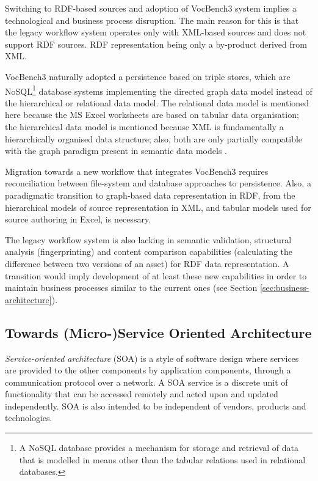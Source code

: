 	Switching to RDF-based sources and adoption of VocBench3 system implies a technological and business process disruption. The main reason for this is that the legacy workflow system operates only with XML-based sources and does not support RDF sources. RDF representation being only a by-product derived from XML. 
	
	VocBench3 naturally adopted a persistence based on triple stores, which are NoSQL\footnote{A NoSQL database provides a mechanism for storage and retrieval of data that is modelled in means other than the tabular relations used in relational databases.} database systems implementing the directed graph data model instead of the hierarchical or relational data model. The relational data model is mentioned here because the MS Excel worksheets are based on tabular data organisation; the hierarchical data model is mentioned because XML is fundamentally a hierarchically organised data structure; also, both are only partially compatible with the graph paradigm present in semantic data models \citep{rdf-semantics}. 
	
	Migration towards a new workflow that integrates VocBench3 requires reconciliation between file-system and database approaches to persistence. Also, a paradigmatic transition to graph-based data representation in RDF, from the hierarchical models of source representation in XML, and tabular models used for source authoring in Excel, is necessary.
	 
	The legacy workflow system is also lacking in semantic validation, structural analysis (fingerprinting) and content comparison capabilities (calculating the difference between two versions of an asset) for RDF data representation. A transition would imply development of at least these new capabilities in order to maintain business processes similar to the current ones (see Section \ref{sec:business-architecture}). 
	
	\subsection{Towards (Micro-)Service Oriented Architecture}
	\label{sec:soa}
	
	\textit{Service-oriented architecture} (SOA) \cite{open2016soa} is a style of software design where services are provided to the other components by application components, through a communication protocol over a network. A SOA service is a discrete unit of functionality that can be accessed remotely and acted upon and updated independently. SOA is also intended to be independent of vendors, products and technologies.
	

